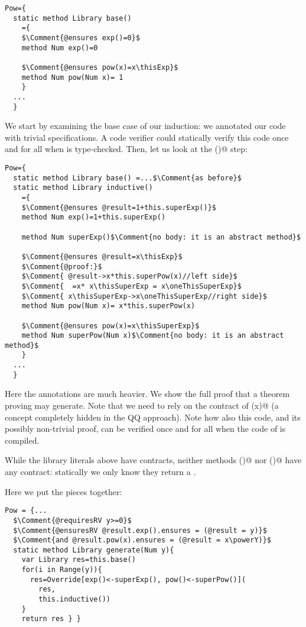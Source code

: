 \saveSpace
\begin{lstlisting}
Pow={
  static method Library base()
    ={
    $\Comment{@ensures exp()=0}$
    method Num exp()=0 
    
    $\Comment{@ensures pow(x)=x\thisExp}$
    method Num pow(Num x)= 1 
    }
  ...
  }
\end{lstlisting}
\saveSpace

\noindent
We start by examining the base case of our induction: we annotated our 
code with trivial specifications.
A code verifier could statically verify this code 
once and for all when \Q@Pow@ is type-checked.
Then, let us look at the \Q@inductive()@ step:

\saveSpace
\begin{lstlisting}
Pow={
  static method Library base() =...$\Comment{as before}$
  static method Library inductive() 
    ={
    $\Comment{@ensures @result=1+this.superExp()}$
    method Num exp()=1+this.superExp() 
      
    method Num superExp()$\Comment{no body: it is an abstract method}$
      
    $\Comment{@ensures @result=x\thisExp}$
    $\Comment{@proof:}$
    $\Comment{ @result->x*this.superPow(x)//left side}$
    $\Comment{  =x* x\thisSuperExp = x\oneThisSuperExp}$
    $\Comment{ x\thisSuperExp->x\oneThisSuperExp//right side}$
    method Num pow(Num x)= x*this.superPow(x)
      
    $\Comment{@ensures pow(x)=x\thisSuperExp}$
    method Num superPow(Num x)$\Comment{no body: it is an abstract method}$
    }
  ...
  }
\end{lstlisting}
\saveSpace

Here the annotations are much heavier.
We show the full proof that a theorem proving may generate.
Note that we need to rely on the contract of \Q@superPow(x)@ (a concept completely hidden in the QQ approach).
Note how also this code, and its possibly non-trivial proof, can be verified once and for all when the code of \Q@Pow@ is compiled.

While the library literals above have contracts,
neither methods \Q@base()@ nor \Q@inductive()@ have any contract:
statically we only know they return a \Q@Library@.

\noindent
Here we put the pieces together:

\saveSpace
\begin{lstlisting}
Pow = {...
  $\Comment{@requiresRV y>=0}$
  $\Comment{@ensuresRV @result.exp().ensures = (@result = y)}$
  $\Comment{and @result.pow(x).ensures = (@result = x\powerY)}$
  static method Library generate(Num y){
    var Library res=this.base()
    for(i in Range(y)){
      res=Override[exp()<-superExp(), pow()<-superPow()](
        res,
        this.inductive())
    }
    return res } }
\end{lstlisting}
\saveSpace

